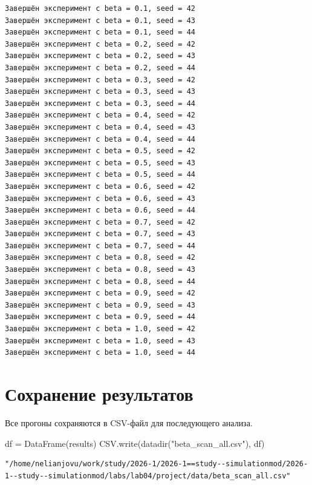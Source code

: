 \documentclass[
  12pt,
  a4paper,
  DIV=11,
  numbers=noendperiod]{scrreprt}
\newenvironment{Shaded}{\begin{snugshade}}{\end{snugshade}}
\newcommand{\FunctionTok}[1]{\textcolor[rgb]{0.28,0.35,0.67}{#1}}
\newcommand{\NormalTok}[1]{\textcolor[rgb]{0.00,0.23,0.31}{#1}}
\newcommand{\OperatorTok}[1]{\textcolor[rgb]{0.37,0.37,0.37}{#1}}
\newcommand{\StringTok}[1]{\textcolor[rgb]{0.13,0.47,0.30}{#1}}
\begin{document}
\begin{verbatim}
Завершён эксперимент с beta = 0.1, seed = 42
Завершён эксперимент с beta = 0.1, seed = 43
Завершён эксперимент с beta = 0.1, seed = 44
Завершён эксперимент с beta = 0.2, seed = 42
Завершён эксперимент с beta = 0.2, seed = 43
Завершён эксперимент с beta = 0.2, seed = 44
Завершён эксперимент с beta = 0.3, seed = 42
Завершён эксперимент с beta = 0.3, seed = 43
Завершён эксперимент с beta = 0.3, seed = 44
Завершён эксперимент с beta = 0.4, seed = 42
Завершён эксперимент с beta = 0.4, seed = 43
Завершён эксперимент с beta = 0.4, seed = 44
Завершён эксперимент с beta = 0.5, seed = 42
Завершён эксперимент с beta = 0.5, seed = 43
Завершён эксперимент с beta = 0.5, seed = 44
Завершён эксперимент с beta = 0.6, seed = 42
Завершён эксперимент с beta = 0.6, seed = 43
Завершён эксперимент с beta = 0.6, seed = 44
Завершён эксперимент с beta = 0.7, seed = 42
Завершён эксперимент с beta = 0.7, seed = 43
Завершён эксперимент с beta = 0.7, seed = 44
Завершён эксперимент с beta = 0.8, seed = 42
Завершён эксперимент с beta = 0.8, seed = 43
Завершён эксперимент с beta = 0.8, seed = 44
Завершён эксперимент с beta = 0.9, seed = 42
Завершён эксперимент с beta = 0.9, seed = 43
Завершён эксперимент с beta = 0.9, seed = 44
Завершён эксперимент с beta = 1.0, seed = 42
Завершён эксперимент с beta = 1.0, seed = 43
Завершён эксперимент с beta = 1.0, seed = 44
\end{verbatim}

\section{Сохранение
результатов}\label{ux441ux43eux445ux440ux430ux43dux435ux43dux438ux435-ux440ux435ux437ux443ux43bux44cux442ux430ux442ux43eux432}

Все прогоны сохраняются в CSV-файл для последующего анализа.

\begin{Shaded}
\begin{Highlighting}[]
\NormalTok{df }\OperatorTok{=} \FunctionTok{DataFrame}\NormalTok{(results)}
\NormalTok{CSV.}\FunctionTok{write}\NormalTok{(}\FunctionTok{datadir}\NormalTok{(}\StringTok{"beta\_scan\_all.csv"}\NormalTok{), df)}
\end{Highlighting}
\end{Shaded}

\begin{verbatim}
"/home/nelianjovu/work/study/2026-1/2026-1==study--simulationmod/2026-1--study--simulationmod/labs/lab04/project/data/beta_scan_all.csv"
\end{verbatim}
\end{document}
